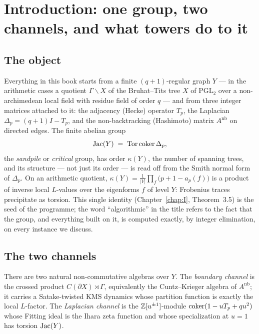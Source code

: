 \chapter{Introduction: one group, two channels, and what towers do to it}\label{chap:intro}

\section{The object}

Everything in this book starts from a finite $(q+1)$-regular graph $Y$ --- in the
arithmetic cases a quotient $\Gamma\backslash X$ of the Bruhat--Tits tree $X$ of
$\mathrm{PGL}_2$ over a non-archimedean local field with residue field of order $q$ --- and
from three integer matrices attached to it: the adjacency (Hecke) operator $T_p$, the
Laplacian $\Delta_p=(q+1)I-T_p$, and the non-backtracking (Hashimoto) matrix
$A^{\mathrm{nb}}$ on directed edges. The finite abelian group
\[
\operatorname{Jac}(Y)\;=\;\operatorname{Tor}\operatorname{coker}\Delta_p ,
\]
the \emph{sandpile} or \emph{critical} group, has order $\kappa(Y)$, the number of
spanning trees, and its structure --- not just its order --- is read off from the Smith
normal form of $\Delta_p$. On an arithmetic quotient, $\kappa(Y)=\frac1{|V|}\prod_f
\bigl(p+1-a_p(f)\bigr)$ is a product of inverse local $L$-values over the eigenforms
$f$ of level $Y$: Frobenius traces precipitate as torsion. This single identity
(Chapter~\ref{chap:I}, Theorem~3.5) is the seed of the programme; the word
``algorithmic'' in the title refers to the fact that the group, and everything built on
it, is computed exactly, by integer elimination, on every instance we discuss.

\section{The two channels}

There are two natural non-commutative algebras over $Y$. The \emph{boundary channel}
is the crossed product $C(\partial X)\rtimes\Gamma$, equivalently the Cuntz--Krieger
algebra of $A^{\mathrm{nb}}$; it carries a Satake-twisted KMS dynamics whose partition
function is exactly the local $L$-factor. The \emph{Laplacian channel} is the
$\mathbb{Z}[u^{\pm1}]$-module $\operatorname{coker}(1-uT_p+qu^2)$ whose Fitting ideal is the Ihara zeta
function and whose specialization at $u=1$ has torsion $\operatorname{Jac}(Y)$.

